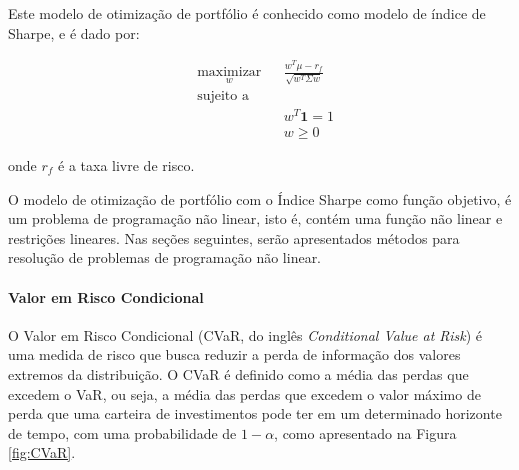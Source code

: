                     \ipar Este modelo de otimização de portfólio é conhecido como modelo de índice de Sharpe, e é dado por:

                    \begin{equation}
                        \label{eq:sharpe}
                        \begin{aligned}
                            & \underset{w}{\text{maximizar}}
                            & & \frac{w^T \mu - r_f}{\sqrt{w^T \Sigma w}} \\
                            & \text{sujeito a} \\
                            & & & w^T \mathbf{1} = 1 \\
                            & & & w \geq 0
                        \end{aligned}
                    \end{equation}

                    \noindent onde $r_f$ é a taxa livre de risco.

                    \ipar O modelo de otimização de portfólio com o Índice Sharpe como função objetivo, é um problema de programação não linear, isto é, contém uma função não linear e restrições lineares. Nas seções seguintes, serão apresentados métodos para resolução de problemas de programação não linear.

                
                \paragraph{Valor em Risco Condicional}

                    \ipar O Valor em Risco Condicional (\acrshort{CVaR}, do inglês \textit{Conditional Value at Risk}) é uma medida de risco que busca reduzir a perda de informação dos valores extremos da distribuição. O \acrshort{CVaR} é definido como a média das perdas que excedem o \acrshort{VaR}, ou seja, a média das perdas que excedem o valor máximo de perda que uma carteira de investimentos pode ter em um determinado horizonte de tempo, com uma probabilidade de $1-\alpha$, como apresentado na Figura \ref{fig:CVaR}.


